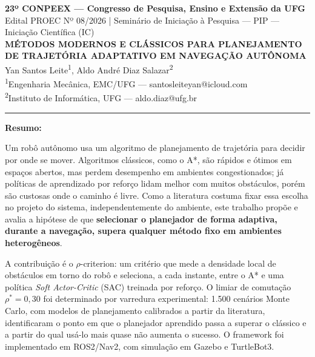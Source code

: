 \documentclass[12pt, a4paper]{article}
\begin{document}
\begin{center}
  {\large\textbf{23º CONPEEX --- Congresso de Pesquisa, Ensino e Extensão da UFG}} \\[4pt]
  {\normalsize Edital PROEC Nº 08/2026 | Seminário de Iniciação à Pesquisa --- PIP --- Iniciação Científica (IC)} \\[8pt]

  {\large\textbf{MÉTODOS MODERNOS E CLÁSSICOS PARA PLANEJAMENTO DE
  TRAJETÓRIA ADAPTATIVO EM NAVEGAÇÃO AUTÔNOMA}} \\[8pt]

  {\normalsize
    Yan Santos Leite\textsuperscript{1},
    Aldo André Diaz Salazar\textsuperscript{2} \\[4pt]
    \textsuperscript{1}Engenharia Mecânica, EMC/UFG --- santosleiteyan@icloud.com \\
    \textsuperscript{2}Instituto de Informática, UFG --- aldo.diaz@ufg.br
  }
\end{center}

\vspace{0.5cm}
\noindent\rule{\linewidth}{0.4pt}
\vspace{0.3cm}

\noindent\textbf{Resumo:}

\noindent
Um robô autônomo usa um algoritmo de planejamento de trajetória para decidir por onde se
mover. Algoritmos clássicos, como o A*, são rápidos e ótimos em espaços abertos, mas perdem
desempenho em ambientes congestionados; já políticas de aprendizado por reforço lidam melhor
com muitos obstáculos, porém são custosas onde o caminho é livre. Como a literatura costuma
fixar essa escolha no projeto do sistema, independentemente do ambiente, este trabalho propõe
e avalia a hipótese de que \textbf{selecionar o planejador de forma adaptiva, durante a
navegação, supera qualquer método fixo em ambientes heterogêneos}.

A contribuição é o $\rho$-criterion: um critério que mede a densidade local de obstáculos em
torno do robô e seleciona, a cada instante, entre o A* e uma política \textit{Soft
Actor-Critic} (SAC) treinada por reforço. O limiar de comutação $\rho^* = 0{,}30$ foi
determinado por varredura experimental: 1.500 cenários Monte Carlo, com modelos de
planejamento calibrados a partir da literatura, identificaram o ponto em que o planejador
aprendido passa a superar o clássico e a partir do qual usá-lo mais quase não aumenta o
sucesso. O framework foi implementado em ROS2/Nav2, com simulação em Gazebo e TurtleBot3.
\end{document}
